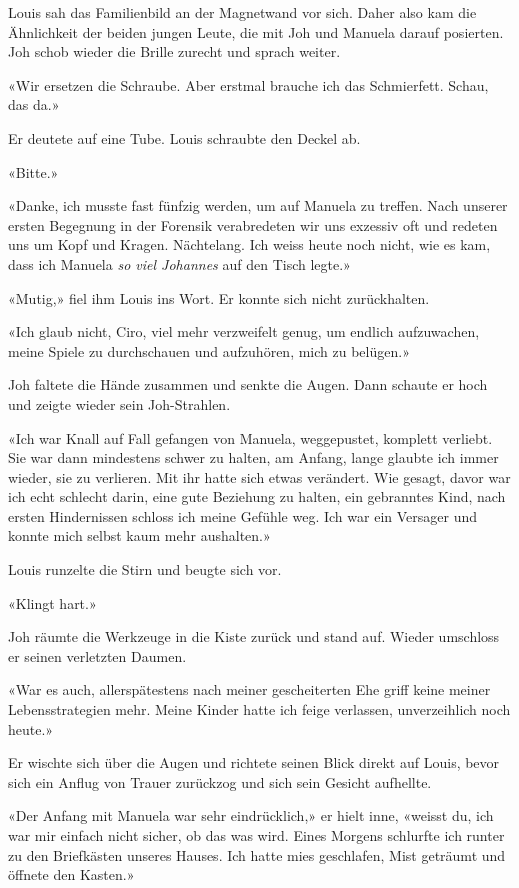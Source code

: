 Louis sah das Familienbild an der Magnetwand vor sich. Daher also kam
die Ähnlichkeit der beiden jungen Leute, die mit Joh und Manuela darauf
posierten. Joh schob wieder die Brille zurecht und sprach weiter.

«Wir ersetzen die Schraube. Aber erstmal brauche ich das Schmierfett.
Schau, das da.»

Er deutete auf eine Tube. Louis schraubte den Deckel ab.

«Bitte.»

«Danke, ich musste fast fünfzig werden, um auf Manuela zu treffen. Nach
unserer ersten Begegnung in der Forensik verabredeten wir uns exzessiv
oft und redeten uns um Kopf und Kragen. Nächtelang. Ich weiss heute noch
nicht, wie es kam, dass ich Manuela \emph{so viel Johannes} auf den
Tisch legte.»

«Mutig,» fiel ihm Louis ins Wort. Er konnte sich nicht zurückhalten.

«Ich glaub nicht, Ciro, viel mehr verzweifelt genug, um endlich
aufzuwachen, meine Spiele zu durchschauen und aufzuhören, mich zu
belügen.»

Joh faltete die Hände zusammen und senkte die Augen.
Dann schaute er hoch und zeigte wieder sein Joh-Strahlen.

«Ich war Knall auf Fall gefangen von Manuela, weggepustet, komplett
verliebt. Sie war dann mindestens schwer zu halten, am Anfang, lange
glaubte ich immer wieder, sie zu verlieren. Mit ihr hatte sich etwas
verändert. Wie gesagt, davor war ich echt schlecht darin, eine gute
Beziehung zu halten, ein gebranntes Kind, nach ersten Hindernissen
schloss ich meine Gefühle weg. Ich war ein Versager und konnte mich
selbst kaum mehr aushalten.»

Louis runzelte die Stirn und beugte sich vor.

«Klingt hart.»

Joh räumte die Werkzeuge in die Kiste zurück und stand auf. Wieder umschloss er 
seinen verletzten Daumen.

«War es auch, allerspätestens nach meiner gescheiterten Ehe griff keine
meiner Lebensstrategien mehr. Meine Kinder hatte ich feige verlassen, unverzeihlich noch heute.»

Er wischte sich über die Augen und richtete seinen Blick direkt auf
Louis, bevor sich ein Anflug von Trauer zurückzog und sich sein Gesicht
aufhellte.

«Der Anfang mit Manuela war sehr eindrücklich,» er hielt inne, «weisst
du, ich war mir einfach nicht sicher, ob das was wird. Eines Morgens
schlurfte ich runter zu den Briefkästen unseres Hauses. Ich hatte mies
geschlafen, Mist geträumt und öffnete den Kasten.»

